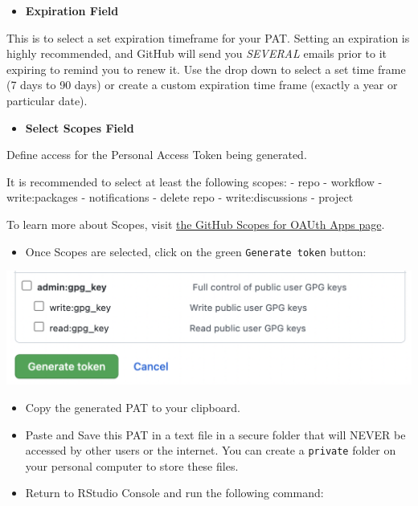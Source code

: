 \documentclass[
]{book}
\providecommand{\tightlist}{%
  \setlength{\itemsep}{0pt}\setlength{\parskip}{0pt}}
\begin{document}
\begin{itemize}
\tightlist
\item
  \textbf{Expiration Field}
\end{itemize}

This is to select a set expiration timeframe for your PAT. Setting an expiration is highly recommended, and GitHub will send you \emph{SEVERAL} emails prior to it expiring to remind you to renew it. Use the drop down to select a set time frame (7 days to 90 days) or create a custom expiration time frame (exactly a year or particular date).

\begin{itemize}
\tightlist
\item
  \textbf{Select Scopes Field}
\end{itemize}

Define access for the Personal Access Token being generated.

It is recommended to select at least the following scopes:
- repo
- workflow
- write:packages
- notifications
- delete repo
- write:discussions
- project

To learn more about Scopes, visit \href{https://docs.github.com/en/developers/apps/building-oauth-apps/scopes-for-oauth-apps}{the GitHub Scopes for OAUth Apps page}.

\begin{itemize}
\tightlist
\item
  Once Scopes are selected, click on the green \texttt{Generate\ token} button:
\end{itemize}

\begin{center}\includegraphics[width=0.8\linewidth]{images/generatepat} \end{center}

\begin{itemize}
\item
  Copy the generated PAT to your clipboard.
\item
  Paste and Save this PAT in a text file in a secure folder that will NEVER be accessed by other users or the internet. You can create a \texttt{private} folder on your personal computer to store these files.
\item
  Return to RStudio Console and run the following command:
\end{itemize}
\end{document}
